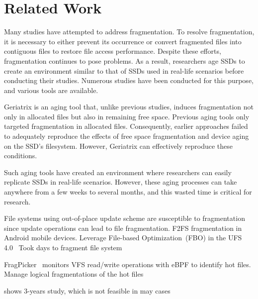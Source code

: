\section{Related Work}
\label{s:related}

Many studies have attempted to address fragmentation.
To resolve fragmentation, it is necessary to either prevent its occurrence or convert fragmented files into contiguous files to restore file access performance.
Despite these efforts, fragmentation continues to pose problems. As a result, researchers age SSDs to create an environment similar to that of SSDs used in real-life scenarios before conducting their studies.
Numerous studies have been conducted for this purpose, and various tools are available.


Geriatrix\cite{geriatrix:atc18} is an aging tool that, unlike previous studies, induces fragmentation not only in allocated files but also in remaining free space.
Previous aging tools only targeted fragmentation in allocated files.
Consequently, earlier approaches failed to adequately reproduce the effects of free space fragmentation and device aging on the SSD's filesystem.
However, Geriatrix can effectively reproduce these conditions.

Such aging tools have created an environment where researchers can easily replicate SSDs in real-life scenarios.
However, these aging processes can take anywhere from a few weeks to several months, and this wasted time is critical for research.


File systems using out-of-place update scheme are susceptible to fragmentation since update operations can lead to file fragmentation.
\cite{f2fs-mobile:nvmsa24} F2FS fragmentation in Android mobile devices.
Leverage File-based Optimization~(FBO) in the UFS 4.0~\cite{ufs4.0}
Took days to fragment file system


FragPicker~\cite{fragpicker:sosp21} monitors VFS read/write operations with eBPF to identify hot files.
Manage logical fragmentations of the hot files


\cite{fs-aging:sigmetric97} shows 3-years study, which is not feasible in may cases
